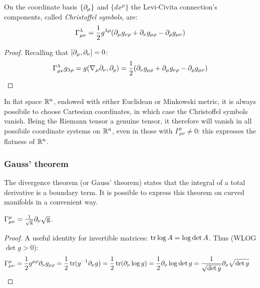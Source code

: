 \begin{proposition}
  On the coordinate basis $ \{\partial_\mu\} $ and $ \{dx^\mu\} $ the Levi-Civita connection's components, called \textit{Christoffel symbols}, are:
  \begin{equation}
    \Gamma^\lambda_{\mu \nu} = \frac{1}{2} g^{\lambda \rho} (\partial_\mu g_{\nu \rho} + \partial_\nu g_{\mu \rho} - \partial_\rho g_{\mu \nu})
    \label{eq:3.40}
  \end{equation}
\end{proposition}
\begin{proof}
  Recalling that $ [\partial_\mu, \partial_\nu] = 0 $:
  \begin{equation*}
    \Gamma^\lambda_{\mu \nu} g_{\lambda \rho} = g(\nabla_\mu \partial_\nu, \partial_\rho) = \frac{1}{2} (\partial_\nu g_{\mu \rho} + \partial_\mu g_{\nu \rho} - \partial_\rho g_{\mu \nu})
  \end{equation*}
\end{proof}

\begin{example}
  In flat space $ \mathbb{R}^n $, endowed with either Euclidean or Minkowski metric, it is always possibile to choose Cartesian coordinates, in which case the Christoffel symbols vanish. Being the Riemann tensor a genuine tensor, it therefore will vanish in all possibile coordinate systems on $ \mathbb{R}^n $, even in those with $ \Gamma^\rho_{\mu \nu} \neq 0 $: this expresses the flatness of $ \mathbb{R}^n $.
\end{example}

\subsubsection{Gauss' theorem}

The divergence theorem (or Gauss' theorem) states that the integral of a total derivative is a boundary term. It is possible to express this theorem on curved manifolds in a convenient way.

\begin{lemma}\label{gauss-lemma}
  $ \Gamma^\mu_{\mu \nu} = \frac{1}{\sqrt{\mathrm{g}}} \partial_\nu \sqrt{\mathrm{g}} $.
\end{lemma}
\begin{proof}
  A useful identity for invertible matrices: $ \operatorname{tr} \log A = \log \det A $. Thus (WLOG $ \det g > 0 $):
  \begin{equation*}
    \begin{split}
      \Gamma^\mu_{\mu \nu}
      &= \frac{1}{2} g^{\mu \rho} \partial_\nu g_{\mu \rho} = \frac{1}{2} \operatorname{tr} (g^{-1} \partial_\nu g) = \frac{1}{2} \operatorname{tr} (\partial_\nu \log g) = \frac{1}{2} \partial_\nu \log \det g = \frac{1}{\sqrt{\det g}} \partial_\nu \sqrt{\det g}
    \end{split}
  \end{equation*}
\end{proof}

